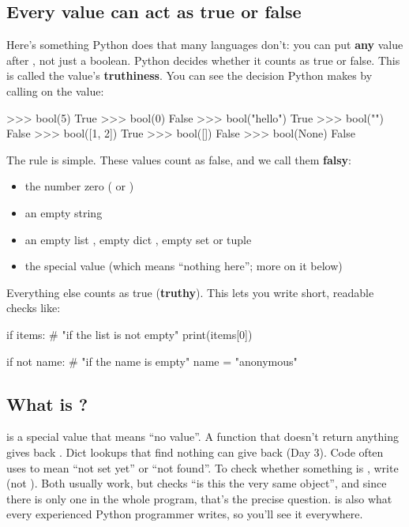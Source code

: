 \documentclass[10pt,a4paper]{article}
\begin{document}
\subsection{Every value can act as true or false}
Here’s something Python does that many languages don’t: you can put \textbf{any} value after , not just a boolean. Python decides whether it counts as true or false. This is called the value’s \textbf{truthiness}. You can see the decision Python makes by calling  on the value:
\begin{txtcode}
>>> bool(5)
True
>>> bool(0)
False
>>> bool("hello")
True
>>> bool("")
False
>>> bool([1, 2])
True
>>> bool([])
False
>>> bool(None)
False
\end{txtcode}
The rule is simple. These values count as false, and we call them \textbf{falsy}:
\begin{itemize}
\item the number zero ( or )
\item an empty string \code{\textquotedbl{}\textquotedbl{}}
\item an empty list \code{[]}, empty dict \code{\{\}}, empty set or tuple
\item the special value  (which means “nothing here”; more on it below)
\end{itemize}
Everything else counts as true (\textbf{truthy}).
This lets you write short, readable checks like:
\begin{pycode}
if items:              # "if the list is not empty"
    print(items[0])

if not name:           # "if the name is empty"
    name = "anonymous"
\end{pycode}
\subsection{What is ?}
 is a special value that means “no value”. A function that doesn’t return anything gives back . Dict lookups that find nothing can give back  (Day 3). Code often uses  to mean “not set yet” or “not found”.
To check whether something is , write  (not ). Both usually work, but  checks “is this the very same object”, and since there is only one  in the whole program, that’s the precise question.  is also what every experienced Python programmer writes, so you’ll see it everywhere.
\end{document}
